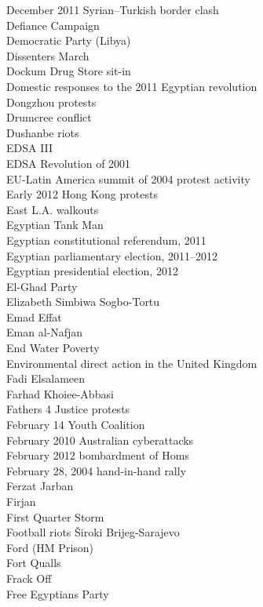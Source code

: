 December 2011 Syrian–Turkish border clash\\
Defiance Campaign\\
Democratic Party (Libya)\\
Dissenters March\\
Dockum Drug Store sit-in\\
Domestic responses to the 2011 Egyptian revolution\\
Dongzhou protests\\
Drumcree conflict\\
Dushanbe riots\\
EDSA III\\
EDSA Revolution of 2001\\
EU-Latin America summit of 2004 protest activity\\
Early 2012 Hong Kong protests\\
East L.A. walkouts\\
Egyptian Tank Man\\
Egyptian constitutional referendum, 2011\\
Egyptian parliamentary election, 2011–2012\\
Egyptian presidential election, 2012\\
El-Ghad Party\\
Elizabeth Simbiwa Sogbo-Tortu\\
Emad Effat\\
Eman al-Nafjan\\
End Water Poverty\\
Environmental direct action in the United Kingdom\\
Fadi Elsalameen\\
Farhad Khoiee-Abbasi\\
Fathers 4 Justice protests\\
February 14 Youth Coalition\\
February 2010 Australian cyberattacks\\
February 2012 bombardment of Homs\\
February 28, 2004 hand-in-hand rally\\
Ferzat Jarban\\
Firjan\\
First Quarter Storm\\
Football riots Široki Brijeg-Sarajevo\\
Ford (HM Prison)\\
Fort Qualls\\
Frack Off\\
Free Egyptians Party\\

